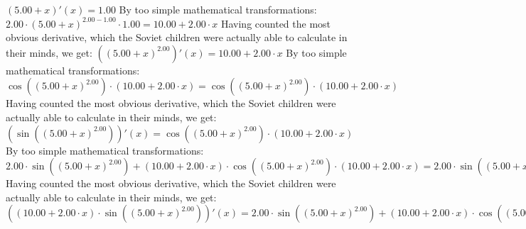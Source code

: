 \documentclass{article}
\begin{document}
$({{5.00} + {x}})'(x) = {1.00}$\newline
\newline
By too simple mathematical transformations:
 ${{{2.00} \cdot {\left({{5.00} + {x}}\right) ^ {{2.00} - {1.00}}}} \cdot {1.00}} = {{10.00} + {{2.00} \cdot {x}}}$ 
 \newline
 \newline 
Having counted the most obvious derivative, which the Soviet children were actually able to calculate in their minds, we get:
$({\left({{5.00} + {x}}\right) ^ {2.00}})'(x) = {{10.00} + {{2.00} \cdot {x}}}$\newline
\newline
By too simple mathematical transformations:
 ${ \cos {\left({\left({{5.00} + {x}}\right) ^ {2.00}}\right)}  \cdot \left({{10.00} + {{2.00} \cdot {x}}}\right)} = { \cos {\left({\left({{5.00} + {x}}\right) ^ {2.00}}\right)}  \cdot \left({{10.00} + {{2.00} \cdot {x}}}\right)}$ 
 \newline
 \newline 
Having counted the most obvious derivative, which the Soviet children were actually able to calculate in their minds, we get:
$( \sin {\left({\left({{5.00} + {x}}\right) ^ {2.00}}\right)} )'(x) = { \cos {\left({\left({{5.00} + {x}}\right) ^ {2.00}}\right)}  \cdot \left({{10.00} + {{2.00} \cdot {x}}}\right)}$\newline
\newline
By too simple mathematical transformations:
 ${{{2.00} \cdot  \sin {\left({\left({{5.00} + {x}}\right) ^ {2.00}}\right)} } + {\left({{10.00} + {{2.00} \cdot {x}}}\right) \cdot { \cos {\left({\left({{5.00} + {x}}\right) ^ {2.00}}\right)}  \cdot \left({{10.00} + {{2.00} \cdot {x}}}\right)}}} = {{{2.00} \cdot  \sin {\left({\left({{5.00} + {x}}\right) ^ {2.00}}\right)} } + {\left({{10.00} + {{2.00} \cdot {x}}}\right) \cdot { \cos {\left({\left({{5.00} + {x}}\right) ^ {2.00}}\right)}  \cdot \left({{10.00} + {{2.00} \cdot {x}}}\right)}}}$ 
 \newline
 \newline 
Having counted the most obvious derivative, which the Soviet children were actually able to calculate in their minds, we get:
$({\left({{10.00} + {{2.00} \cdot {x}}}\right) \cdot  \sin {\left({\left({{5.00} + {x}}\right) ^ {2.00}}\right)} })'(x) = {{{2.00} \cdot  \sin {\left({\left({{5.00} + {x}}\right) ^ {2.00}}\right)} } + {\left({{10.00} + {{2.00} \cdot {x}}}\right) \cdot { \cos {\left({\left({{5.00} + {x}}\right) ^ {2.00}}\right)}  \cdot \left({{10.00} + {{2.00} \cdot {x}}}\right)}}}$\newline
\end{document}
